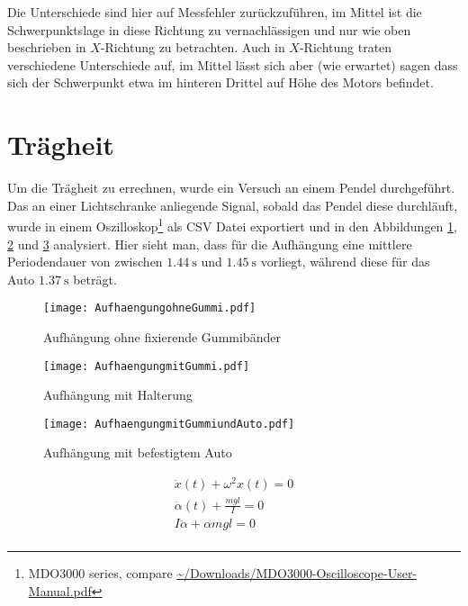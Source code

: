 \documentclass[10pt]{article}
\begin{document}
    Die Unterschiede sind hier auf Messfehler zurückzuführen, im Mittel ist die Schwerpunktslage in diese Richtung zu vernachlässigen und nur wie oben beschrieben in $X$-Richtung zu betrachten.
    Auch in $X$-Richtung traten verschiedene Unterschiede auf, im Mittel lässt sich aber (wie erwartet) sagen dass sich der Schwerpunkt etwa im hinteren Drittel auf Höhe des Motors befindet.

\section{Trägheit}
Um die Trägheit zu errechnen, wurde ein Versuch an einem Pendel durchgeführt.
Das an einer Lichtschranke anliegende Signal, sobald das Pendel diese durchläuft, wurde in einem Oszilloskop\footnote{MDO3000 series, compare \url{~/Downloads/MDO3000-Oscilloscope-User-Manual.pdf}} als CSV Datei exportiert und in den Abbildungen \ref{fig:AufhaengungohneGummi}, \ref{fig:AufhaengungmitGummi} und \ref{fig:AufhaengungmitGummiundAuto} analysiert.
Hier sieht man, dass für die Aufhängung eine mittlere Periodendauer von zwischen $\SI{1,44}{\second}$ und $\SI{1,45}{\second}$ vorliegt, während diese für das Auto $\SI{1,37}{\second}$ beträgt.



\begin{figure}[htbp]
    \centering
    \texttt{[image: AufhaengungohneGummi.pdf]}
    \caption{Aufhängung ohne fixierende Gummibänder}\label{fig:AufhaengungohneGummi}
\end{figure}
\begin{figure}[htbp]
    \centering
    \texttt{[image: AufhaengungmitGummi.pdf]}
    \caption{Aufhängung mit Halterung}\label{fig:AufhaengungmitGummi}
\end{figure}
\begin{figure}[htbp]
    \centering
    \texttt{[image: AufhaengungmitGummiundAuto.pdf]}
    \caption{Aufhängung mit befestigtem Auto}\label{fig:AufhaengungmitGummiundAuto}
\end{figure}


\begin{eqnarray}
    \ddot{x}(t) + \omega^2x(t) = 0 \\
    \ddot{\alpha}(t) + \frac{mgl}{I} = 0 \\
    I\ddot{\alpha} + \alpha mgl = 0 \\
\end{eqnarray}
\end{document}
